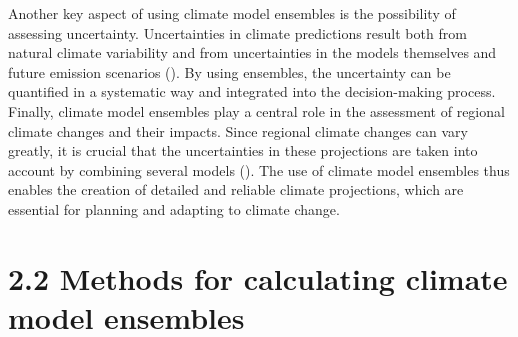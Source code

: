 \documentclass[
]{krantz}
\begin{document}
Another key aspect of using climate model ensembles is the possibility of assessing uncertainty. Uncertainties in climate predictions result both from natural climate variability and from uncertainties in the models themselves and future emission scenarios (\citet{eyring2016overview}). By using ensembles, the uncertainty can be quantified in a systematic way and integrated into the decision-making process.
Finally, climate model ensembles play a central role in the assessment of regional climate changes and their impacts. Since regional climate changes can vary greatly, it is crucial that the uncertainties in these projections are taken into account by combining several models (\citet{semenov2010use}). The use of climate model ensembles thus enables the creation of detailed and reliable climate projections, which are essential for planning and adapting to climate change.

\section{2.2 Methods for calculating climate model ensembles}\label{methods-for-calculating-climate-model-ensembles}
\end{document}
